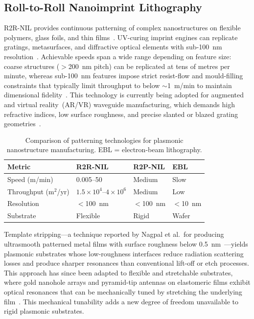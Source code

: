 \documentclass[twocolumn,10pt]{article}
\begin{document}
\subsection{Roll-to-Roll Nanoimprint Lithography}

R2R-NIL provides continuous patterning of complex nanostructures on
flexible polymers, glass foils, and thin
films~\cite{kooy2014review,ahn2008high}.  UV-curing imprint engines can
replicate gratings, metasurfaces, and diffractive optical elements with
sub-100~nm resolution~\cite{ahn2008high}.  Achievable speeds span a
wide range depending on feature size: coarse structures
($>$200~nm pitch) can be replicated at tens of metres per minute,
whereas sub-100~nm features impose strict resist-flow and mould-filling
constraints that typically limit throughput to below $\sim$1~m/min to
maintain dimensional fidelity~\cite{ahn2008high,kooy2014review}.  This
technology is currently being adopted for augmented and virtual
reality~(AR/VR) waveguide manufacturing, which demands high refractive
indices, low surface roughness, and precise slanted or blazed grating
geometries~\cite{kooy2014review}.

\begin{table}[H]
\small
\centering
\caption{Comparison of patterning technologies for plasmonic
nanostructure manufacturing.  EBL = electron-beam lithography.}
\label{tab:fabrication}
\begin{tabularx}{\columnwidth}{@{}lXXX@{}}
\toprule
\textbf{Metric} & \textbf{R2R-NIL} & \textbf{R2P-NIL} &
  \textbf{EBL} \\
\midrule
Speed (m/min) & 0.005--50 & Medium & Slow \\
Throughput (m$^2$/yr) & $1.5\!\times\!10^4$--$4\!\times\!10^6$ &
  Medium & Low \\
Resolution & $<$100~nm & $<$100~nm & $<$10~nm \\
Substrate & Flexible & Rigid & Wafer \\
\bottomrule
\end{tabularx}
\end{table}

Template stripping---a technique reported by Nagpal et al.\ for producing
ultrasmooth patterned metal films with surface roughness below
0.5~nm~\cite{nagpal2009ultrasmooth}---yields plasmonic substrates whose
low-roughness interfaces reduce radiation scattering losses and produce
sharper resonances than conventional lift-off or etch processes.
This approach has since been adapted to flexible and stretchable
substrates, where gold nanohole arrays and pyramid-tip antennas on
elastomeric films exhibit optical resonances that can be mechanically
tuned by stretching the underlying
film~\cite{nagpal2009ultrasmooth}.  This mechanical tunability adds a
new degree of freedom unavailable to rigid plasmonic substrates.
\end{document}
